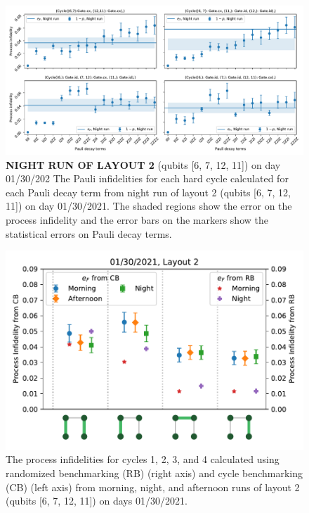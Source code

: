 \begin{figure}[ht!]
    \includegraphics[scale=0.56]{CBPauliInfidelities_30_01_2021_NightRun_Layout2_Cycle1_2_3_4.pdf}
    \caption{ \textbf{NIGHT RUN OF LAYOUT 2} (qubits [6, 7, 12, 11]) on day 01/30/202  The Pauli infidelities for each hard cycle calculated for each Pauli decay term from night run of layout 2 (qubits [6, 7, 12, 11]) on day 01/30/2021. The shaded regions show the error on the process infidelity and the error bars on the markers show the statistical errors on Pauli decay terms. }
    \label{fig:PauliInfidelities30Night_Story7}
\end{figure}





















\begin{figure}[ht!]
    \includegraphics[scale=0.5]{ProcessInfidelities_CB_RB_Data_01_30_2021Layout2aligned.pdf}
    \caption{The process infidelities for cycles  1, 2, 3, and 4 calculated using randomized benchmarking (RB) (right axis) and cycle benchmarking (CB) (left axis) from morning, night, and afternoon runs of layout 2 (qubits [6, 7, 12, 11]) on days 01/30/2021.}
    \label{fig:processinfidelitiesStory7}
\end{figure}


